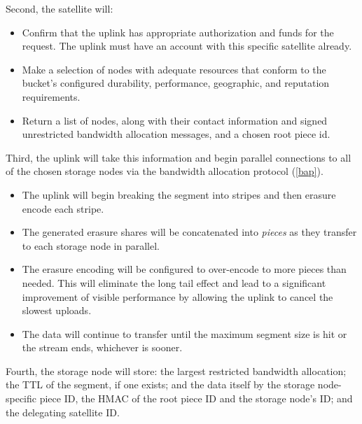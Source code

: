 \documentclass[11pt,fleqn,openany]{book}
\begin{document}
Second, the satellite will:
\begin{itemize}
\item Confirm that the uplink has appropriate authorization and funds for
  the request. The uplink must have an account with this specific satellite
  already.
\item Make a selection of nodes with adequate resources that conform to the
  bucket's configured durability, performance, geographic, and reputation
  requirements.
\item Return a list of nodes, along with their contact information and
  signed unrestricted bandwidth allocation messages, and a chosen root piece
  id.
\end{itemize}

Third, the uplink will take this information and begin parallel connections to
  all of the chosen storage nodes via the bandwidth allocation protocol
  (\ref{bap}).

\begin{itemize}
\item The uplink will begin breaking the segment into stripes and then
  erasure encode each stripe.
\item The generated erasure shares will be concatenated into {\em pieces} as they
  transfer to each storage node in parallel.
\item The erasure encoding will be configured to over-encode to more pieces
  than needed. This will eliminate the long tail effect and lead to a
  significant improvement of visible performance by allowing the uplink to
  cancel the slowest uploads.
\item The data will continue to transfer until the maximum segment size is hit
  or the stream ends, whichever is sooner.
\end{itemize}

Fourth, the storage node will store: the largest restricted bandwidth allocation;
the TTL of the segment, if one exists; and the data itself by the storage
node-specific piece ID, the HMAC of the root piece ID and the storage node's
ID; and the delegating satellite ID.
\end{document}
